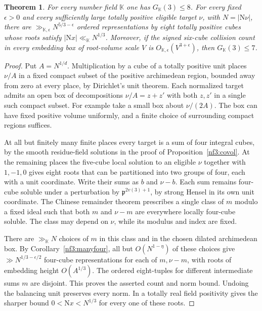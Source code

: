\documentclass[11pt,letterpaper]{article}
\newtheorem{theorem}{Theorem}[section]
\theoremstyle{definition}
\numberwithin{equation}{section}
\begin{document}
\begin{theorem}\label{nf3:global}
For every number field $\mathbb K$ one has $G_{\mathbb K}(3)\le8$.
For every fixed $\epsilon>0$ and every sufficiently large totally positive
eligible target $\nu$, with $N=|\mathrm N\nu|$, there are
$\gg_{\mathbb K,\epsilon}N^{5/3-\epsilon}$ ordered representations by
eight totally positive cubes whose roots satisfy
$|\mathrm N x|\ll_{\mathbb K}N^{1/3}$. Moreover, if the signed six-cube
collision count in every embedding box of root-volume scale $V$ is
$O_{\mathbb K,\epsilon}(V^{3+\epsilon})$, then $G_{\mathbb K}(3)\le7$.
\end{theorem}
\begin{proof}
Put $A=N^{1/d}$. Multiplication by a cube of a totally positive unit
places $\nu/A$ in a fixed compact subset of the positive archimedean
region, bounded away from zero at every place, by Dirichlet's unit
theorem. Each normalized target admits an open box of decompositions
$\nu/A=z+z'$ with both $z,z'$ in a single such compact subset.
For example take a small box about $\nu/(2A)$. The box can have fixed
positive volume uniformly, and a finite choice of surrounding compact
regions suffices.

At all but finitely many finite places every target is a sum of four
integral cubes, by the smooth residue-field solutions in the proof of
Proposition~\ref{nf3:covol}. At the remaining places the five-cube local
solution to an eligible $\nu$ together with $1,-1,0$ gives eight roots
that can be partitioned into two groups of four, each with a unit
coordinate. Write their sums as $b$ and $\nu-b$. Each sum remains
four-cube soluble under a perturbation by $\mathfrak p^{2v(3)+1}$,
by strong Hensel in its own unit coordinate. The Chinese remainder
theorem prescribes a single class of $m$ modulo a fixed ideal such
that both $m$ and $\nu-m$ are everywhere locally four-cube soluble.
The class may depend on $\nu$, while its modulus and index are fixed.

There are $\gg_{\mathbb K}N$ choices of $m$ in this class and in the
chosen dilated archimedean box. By Corollary~\ref{nf3:manyfour}, all
but $O(N^{1-\eta})$ of these choices give
$\gg N^{1/3-\epsilon/2}$ four-cube representations for each of
$m,\nu-m$, with roots of embedding height $O(A^{1/3})$. The ordered
eight-tuples for different intermediate sums $m$ are disjoint.
This proves the asserted count and norm bound. Undoing the balancing
unit preserves every norm. In a totally real field positivity gives
the sharper bound $0<\mathrm N x<N^{1/3}$ for every one of these roots.


\end{proof}
\end{document}
